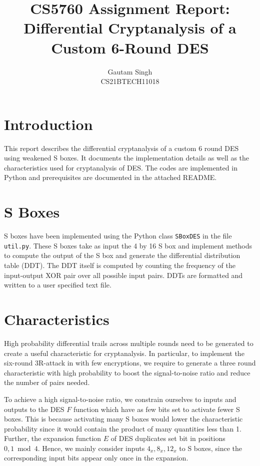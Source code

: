 \documentclass[journal,12pt,twocolumn]{IEEEtran}
\begin{document}
\vspace{3cm}
\title{CS5760 Assignment Report: Differential Cryptanalysis of a Custom 6-Round DES}
\author{Gautam Singh\\CS21BTECH11018}
\maketitle
\tableofcontents

\section{Introduction}
\label{sec:intro}
This report describes the differential cryptanalysis of a custom 6 round DES
using weakened S boxes. It documents the implementation details as well as the
characteristics used for cryptanalysis of DES. The codes are implemented in
Python and prerequisites are documented in the attached README.

\section{S Boxes}
\label{sec:s-box}
S boxes have been implemented using the Python class \texttt{SBoxDES} in the
file \texttt{util.py}. These S boxes take as input the 4 by 16 S box and
implement methods to compute the output of the S box and generate the
differential distribution table (DDT). The DDT itself is computed by counting
the frequency of the input-output XOR pair over all possible input pairs. DDTs
are formatted and written to a user specified text file.

\section{Characteristics}
\label{sec:char}

High probability differential trails across multiple rounds need to be generated
to create a useful characteristic for cryptanalysis. In particular, to implement
the six-round 3R-attack in \cite{bihamDifferentialCryptanalysisDESlike1991} with
few encryptions, we require to generate a three round characteristic with high
probability to boost the signal-to-noise ratio and reduce the number of pairs
needed. 

To achieve a high signal-to-noise ratio, we constrain ourselves to inputs and
outputs to the DES \(F\) function which have as few bits set to activate fewer S
boxes. This is because activating many S boxes would lower the characteristic
probability since it would contain the product of many quantities less than 1.
Further, the expansion function \(E\) of DES duplicates set bit in positions
\(0, 1 \bmod 4\). Hence, we mainly consider inputs \(4_x, 8_x, 12_x\) to S
boxes, since the corresponding input bits appear only once in the expansion.
\end{document}
